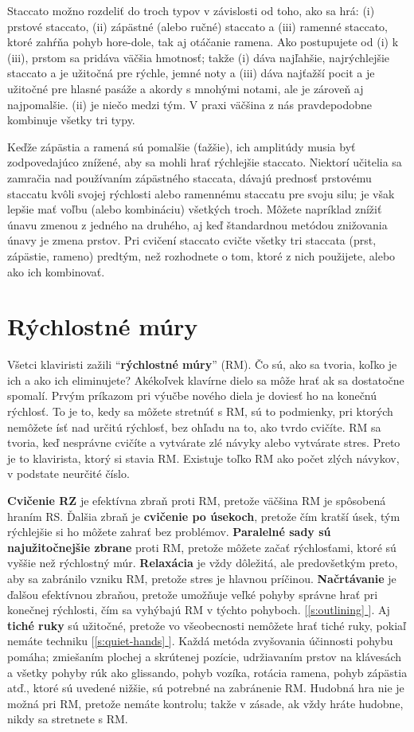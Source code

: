 \documentclass[11pt,a4paper]{book}
\newcommand*{\fullref}[1]{\hyperref[{#1}]{\ref*{#1} \nameref*{#1}}} %
\newcommand*{\fullrefp}[1]{[\fullref{#1}]} %
\begin{document}
Staccato možno rozdeliť do troch typov v závislosti od toho, ako sa hrá: (i) prstové staccato, (ii) zápästné (alebo ručné) staccato a (iii) ramenné staccato, ktoré zahŕňa pohyb hore-dole, tak aj otáčanie ramena. Ako postupujete od (i) k (iii), prstom sa pridáva väčšia hmotnosť; takže (i) dáva najľahšie, najrýchlejšie staccato a je užitočná pre rýchle, jemné noty a (iii) dáva najťažší pocit a je užitočné pre hlasné pasáže a akordy s mnohými notami, ale je zároveň aj najpomalšie. (ii) je niečo medzi tým. V praxi väčšina z nás pravdepodobne kombinuje všetky tri typy.

Keďže zápästia a ramená sú pomalšie (ťažšie), ich amplitúdy musia byť zodpovedajúco znížené, aby sa mohli hrať rýchlejšie staccato. Niektorí učitelia sa zamračia nad používaním zápästného staccata, dávajú prednosť prstovému staccatu kvôli svojej rýchlosti alebo ramennému staccatu pre svoju silu; je však lepšie mať voľbu (alebo kombináciu) všetkých troch. Môžete napríklad znížiť únavu zmenou z jedného na druhého, aj keď štandardnou metódou znižovania únavy je zmena prstov. Pri cvičení staccato cvičte všetky tri staccata (prst, zápästie, rameno) predtým, než rozhodnete o tom, ktoré z nich použijete, alebo ako ich kombinovať.

\section{Rýchlostné múry}\label{s:speed-walls}
Všetci klaviristi zažili “\textbf{rýchlostné múry}” (RM). Čo sú, ako sa tvoria, koľko je ich a ako ich eliminujete? Akékoľvek klavírne dielo sa môže hrať ak sa dostatočne spomalí. Prvým príkazom pri výučbe nového diela je doviesť ho na konečnú rýchlosť. To je to, kedy sa môžete stretnúť s RM, sú to podmienky, pri ktorých nemôžete ísť nad určitú rýchlosť, bez ohľadu na to, ako tvrdo cvičíte. RM sa tvoria, keď nesprávne cvičíte a vytvárate zlé návyky alebo vytvárate stres. Preto je to klavirista, ktorý si stavia RM. Existuje toľko RM ako počet zlých návykov, v podstate neurčité číslo.

\textbf{Cvičenie RZ} je efektívna zbraň proti RM, pretože väčšina RM je spôsobená hraním RS. Ďalšia zbraň je \textbf{cvičenie po úsekoch}, pretože čím kratší úsek, tým rýchlejšie si ho môžete zahrať bez problémov. \textbf{Paralelné sady sú najužitočnejšie zbrane} proti RM, pretože môžete začať rýchlosťami, ktoré sú vyššie než rýchlostný múr. \textbf{Relaxácia} je vždy dôležitá, ale predovšetkým preto, aby sa zabránilo vzniku RM, pretože stres je hlavnou príčinou. \textbf{Načrtávanie} je ďalšou efektívnou zbraňou, pretože umožňuje veľké pohyby správne hrať pri konečnej rýchlosti, čím sa vyhýbajú RM v týchto pohyboch. \fullrefp{s:outlining}. Aj \textbf{tiché ruky} sú užitočné, pretože vo všeobecnosti nemôžete hrať tiché ruky, pokiaľ nemáte techniku ​\fullrefp{s:quiet-hands}. Každá metóda zvyšovania účinnosti pohybu pomáha; zmiešaním plochej a skrútenej pozície, udržiavaním prstov na klávesách a všetky pohyby rúk ako glissando, pohyb vozíka, rotácia ramena, pohyb zápästia atď., ktoré sú uvedené nižšie, sú potrebné na zabránenie RM. Hudobná hra nie je možná pri RM, pretože nemáte kontrolu; takže v zásade, ak vždy hráte hudobne, nikdy sa stretnete s RM.
\end{document}
